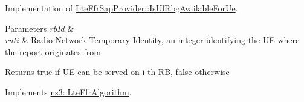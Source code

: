Implementation of \hyperlink{classns3_1_1LteFfrSapProvider_a3ef80840549b8ea3d50d2cef8a9866e2}{Lte\+Ffr\+Sap\+Provider\+::\+Is\+Ul\+Rbg\+Available\+For\+Ue}. 


\begin{DoxyParams}{Parameters}
{\em rb\+Id} & \\
\hline
{\em rnti} & Radio Network Temporary Identity, an integer identifying the UE where the report originates from \\
\hline
\end{DoxyParams}
\begin{DoxyReturn}{Returns}
true if UE can be served on i-\/th RB, false otherwise 
\end{DoxyReturn}


Implements \hyperlink{classns3_1_1LteFfrAlgorithm_a0c2c54224720e5bbb8c6d05413e6bb63}{ns3\+::\+Lte\+Ffr\+Algorithm}.


